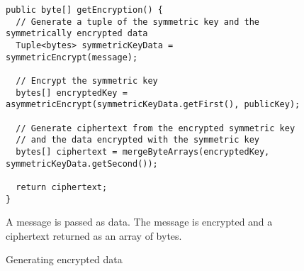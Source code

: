 \begin{figure}[H]
  \centering
  \begin{verbatim}
public byte[] getEncryption() {
  // Generate a tuple of the symmetric key and the symmetrically encrypted data
  Tuple<bytes> symmetricKeyData = symmetricEncrypt(message);

  // Encrypt the symmetric key
  bytes[] encryptedKey = asymmetricEncrypt(symmetricKeyData.getFirst(), publicKey);

  // Generate ciphertext from the encrypted symmetric key
  // and the data encrypted with the symmetric key
  bytes[] ciphertext = mergeByteArrays(encryptedKey, symmetricKeyData.getSecond());

  return ciphertext;
}
  \end{verbatim}
  \caption{
  	Generating encrypted data
  }{
  	A message is passed as data. The message is encrypted and a ciphertext returned as an array of bytes.
  }
  \label{code:encrypt_data}
\end{figure}
